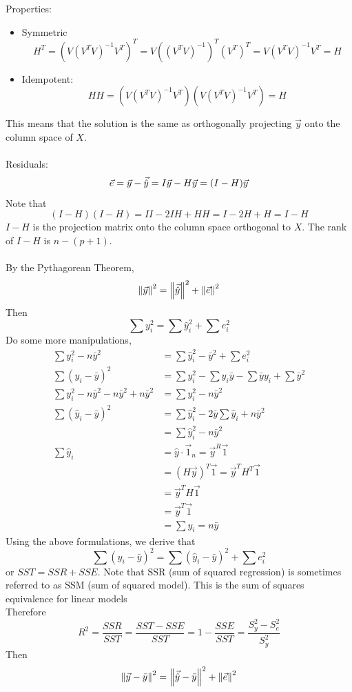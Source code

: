 \documentclass[12pt]{article}
\begin{document}
Properties: \begin{itemize} 
\item Symmetric $$H^T = (V(V^TV)^{-1}V^T)^T = V((V^TV)^{-1})^T(V^T)^T = V(V^TV)^{-1}V^T = H $$ 
\item Idempotent: $$ HH = (V(V^TV)^{-1}V^T)(V(V^TV)^{-1}V^T) = H $$ \end{itemize} 
This means that the solution is the same as orthogonally projecting $\vec{y}$ onto the column space of $X$. \\~\\
Residuals: $$ \vec{e} = \vec{y} - \vec{\hat{y}} = I\vec{y} - H\vec{y} = (I-H)\vec{y} $$ 
Note that $$(I - H)(I-H) = II - 2IH + HH = I - 2H + H = I - H $$ 
$I-H$ is the projection matrix onto the column space orthogonal to $X$. The rank of $I-H$ is $n - (p+1)$.\\~\\
By the Pythagorean Theorem,  $$\norm{\vec{y}}^{2} = \norm{\vec{\hat{y}}}^{2} + \norm{\vec{e}}^{2}$$ 
Then $$\sum y_i^2 = \sum \hat{y}_i^2 + \sum e_i^2$$ 
Do some more manipulations, $$ \begin{aligned} 
\sum y_i^2 - n\bar{y}^2 &= \sum \hat{y}_i^2 - \bar{y}^2 + \sum e_i^2 \\ \sum (y_i - \bar{y})^2 &= \sum y_i^2 - \sum y_i\bar{y} - \sum \bar{y}y_i + \sum \bar{y}^2 \\ \sum y_i^2 - n\bar{y}^2 - n\bar{y}^2 + n\bar{y}^2 &= \sum y_i^2 - n\bar{y}^2 \\ 
\sum (\hat{y}_i - \bar{y})^2 &= \sum \hat{y}_i^2 - 2\bar{y} \sum \hat{y}_i + n\bar{y}^2 \\ &= \sum \hat{y}_i^2 - n\bar{y}^2 \\ \sum \hat{y}_i &= \hat{y} \cdot \vec{1}_n = \vec{y}^R\vec{1} \\ &= (H\vec{y})^T\vec{1} = \vec{y}^TH^T\vec{1} \\ &= \vec{y}^TH\vec{1} \\ &= \vec{y}^T\vec{1} \\ &= \sum y_i = n\bar{y} \end{aligned} $$ 
Using the above formulations, we derive that 
$$ \sum (y_i - \bar{y})^2 = \sum (\hat{y}_i - \bar{y})^2 + \sum e_i^2$$ or $SST = SSR + SSE$. Note that SSR (sum of squared regression) is sometimes referred to as SSM (sum of squared model). This is the sum of squares equivalence for linear models \\ Therefore 
$$R^2 = \frac{SSR}{SST} = \frac{SST - SSE}{SST} = 1 - \frac{SSE}{SST} = \frac{S_y^2 - S_e^2}{S_y^2}$$
Then $$\norm{\vec{y} - \bar{y}}^2 = \norm{\vec{\hat{y}} - \bar{y}}^2 + \norm{\vec{e}}^2$$ 
\end{document}
